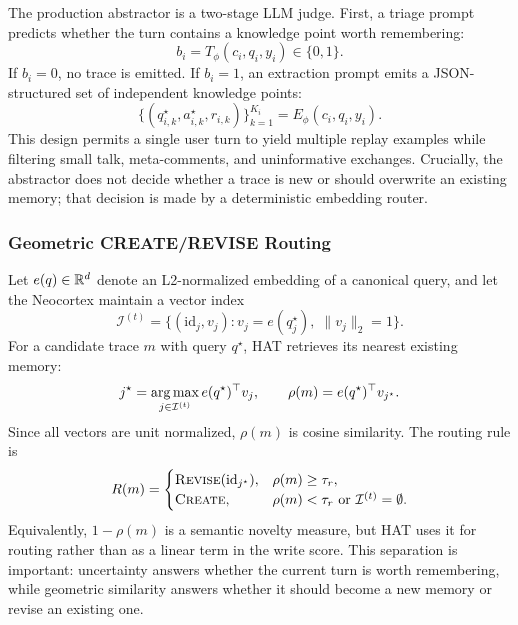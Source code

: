 The production abstractor is a two-stage LLM judge.
First, a triage prompt predicts whether the turn contains a knowledge point worth remembering:
\begin{equation}
  b_i = T_{\phi}(c_i,q_i,y_i) \in \{0,1\}.
  \label{eq:triage}
\end{equation}
If $b_i=0$, no trace is emitted.
If $b_i=1$, an extraction prompt emits a JSON-structured set of independent knowledge points:
\begin{equation}
  \{(q^{\star}_{i,k}, a^{\star}_{i,k}, r_{i,k})\}_{k=1}^{K_i}
  =
  E_{\phi}(c_i,q_i,y_i).
  \label{eq:extract}
\end{equation}
This design permits a single user turn to yield multiple replay examples while filtering small talk, meta-comments, and uninformative exchanges.
Crucially, the abstractor does not decide whether a trace is new or should overwrite an existing memory; that decision is made by a deterministic embedding router.

\subsubsection{Geometric CREATE/REVISE Routing}
\label{sec:method:routing}

Let $e(q)\in\mathbb{R}^d$ denote an L2-normalized embedding of a canonical query, and let the Neocortex maintain a vector index
\begin{equation}
  \mathcal{I}^{(t)} = \{(\mathrm{id}_j, v_j) : v_j=e(q_j^{\star}),\; \|v_j\|_2=1\}.
  \label{eq:vector_index}
\end{equation}
For a candidate trace $m$ with query $q^{\star}$, HAT retrieves its nearest existing memory:
\begin{equation}
  j^{\star}
  =
  \operatorname*{arg\,max}_{j \in \mathcal{I}^{(t)}}
  e(q^{\star})^{\top} v_j,
  \qquad
  \rho(m)=e(q^{\star})^{\top} v_{j^{\star}}.
  \label{eq:nearest_memory}
\end{equation}
Since all vectors are unit normalized, $\rho(m)$ is cosine similarity.
The routing rule is
\begin{equation}
  R(m)=
  \begin{cases}
    \textsc{Revise}(\mathrm{id}_{j^{\star}}), & \rho(m) \ge \tau_r, \\
    \textsc{Create}, & \rho(m) < \tau_r \text{ or } \mathcal{I}^{(t)}=\emptyset.
  \end{cases}
  \label{eq:create_revise}
\end{equation}
Equivalently, $1-\rho(m)$ is a semantic novelty measure, but HAT uses it for routing rather than as a linear term in the write score.
This separation is important: uncertainty answers whether the current turn is worth remembering, while geometric similarity answers whether it should become a new memory or revise an existing one.

